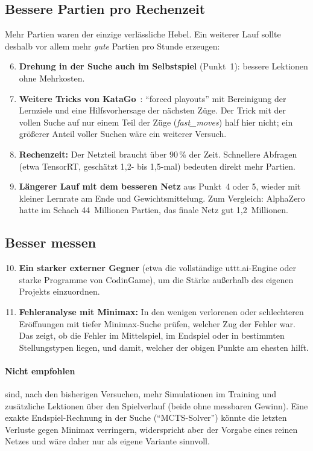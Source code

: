 \documentclass[11pt,a4paper]{article}
\begin{document}
\subsection{Bessere Partien pro Rechenzeit}

Mehr Partien waren der einzige verlässliche Hebel. Ein weiterer Lauf sollte deshalb vor allem mehr
\emph{gute} Partien pro Stunde erzeugen:

\begin{enumerate}\setcounter{enumi}{5}
\item \textbf{Drehung in der Suche auch im Selbstspiel} (Punkt~1): bessere Lektionen ohne Mehrkosten.
\item \textbf{Weitere Tricks von KataGo}~\cite{katago}: \enquote{forced playouts} mit Bereinigung der
Lernziele und eine Hilfsvorhersage der nächsten Züge. Der Trick mit der vollen Suche auf nur einem Teil
der Züge (\emph{fast\_moves}) half hier nicht; ein größerer Anteil voller Suchen wäre ein weiterer Versuch.
\item \textbf{Rechenzeit:} Der Netzteil braucht über 90\,\% der Zeit. Schnellere Abfragen (etwa TensorRT,
geschätzt 1{,}2- bis 1{,}5-mal) bedeuten direkt mehr Partien.
\item \textbf{Längerer Lauf mit dem besseren Netz} aus Punkt~4 oder 5, wieder mit kleiner Lernrate am
Ende und Gewichtsmittelung. Zum Vergleich: AlphaZero hatte im Schach 44~Millionen Partien, das finale Netz
gut 1{,}2~Millionen.
\end{enumerate}

\subsection{Besser messen}

\begin{enumerate}\setcounter{enumi}{9}
\item \textbf{Ein starker externer Gegner} (etwa die vollständige uttt.ai-Engine oder starke Programme von
CodinGame), um die Stärke außerhalb des eigenen Projekts einzuordnen.
\item \textbf{Fehleranalyse mit Minimax:} In den wenigen verlorenen oder schlechteren Eröffnungen mit tiefer
Minimax-Suche prüfen, welcher Zug der Fehler war. Das zeigt, ob die Fehler im Mittelspiel, im Endspiel
oder in bestimmten Stellungstypen liegen, und damit, welcher der obigen Punkte am ehesten hilft.
\end{enumerate}

\paragraph{Nicht empfohlen} sind, nach den bisherigen Versuchen, mehr Simulationen im Training und
zusätzliche Lektionen über den Spielverlauf (beide ohne messbaren Gewinn). Eine exakte Endspiel-Rechnung in
der Suche (\enquote{MCTS-Solver}) könnte die letzten Verluste gegen Minimax verringern, widerspricht aber
der Vorgabe eines reinen Netzes und wäre daher nur als eigene Variante sinnvoll.
\end{document}
